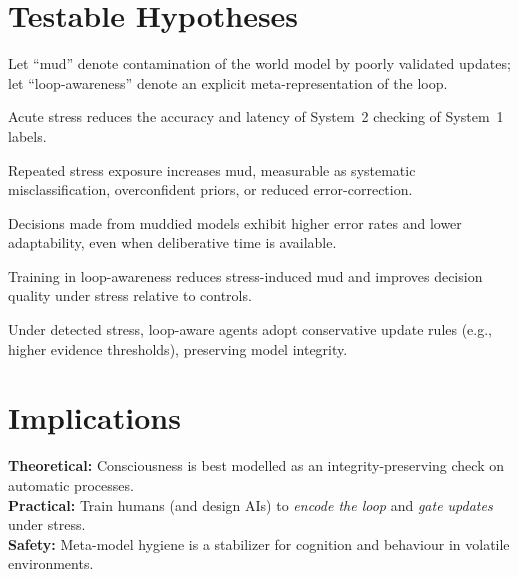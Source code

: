 \documentclass[11pt,a4paper]{article}
\begin{document}
\section{Testable Hypotheses}
Let ``mud'' denote contamination of the world model by poorly validated updates; let ``loop-awareness'' denote an explicit meta-representation of the loop.

\begin{description}[style=nextline]
  \item[H1 (Stress--Checking).] Acute stress reduces the accuracy and latency of System~2 checking of System~1 labels.
  \item[H2 (Mud Accumulation).] Repeated stress exposure increases mud, measurable as systematic misclassification, overconfident priors, or reduced error-correction.
  \item[H3 (Decision Degradation).] Decisions made from muddied models exhibit higher error rates and lower adaptability, even when deliberative time is available.
  \item[H4 (Meta-Model Protection).] Training in loop-awareness reduces stress-induced mud and improves decision quality under stress relative to controls.
  \item[H5 (Gating Mechanism).] Under detected stress, loop-aware agents adopt conservative update rules (e.g., higher evidence thresholds), preserving model integrity.
\end{description}

\section{Implications}
\textbf{Theoretical:} Consciousness is best modelled as an integrity-preserving check on automatic processes.\\
\textbf{Practical:} Train humans (and design AIs) to \emph{encode the loop} and \emph{gate updates} under stress.\\
\textbf{Safety:} Meta-model hygiene is a stabilizer for cognition and behaviour in volatile environments.
\end{document}
